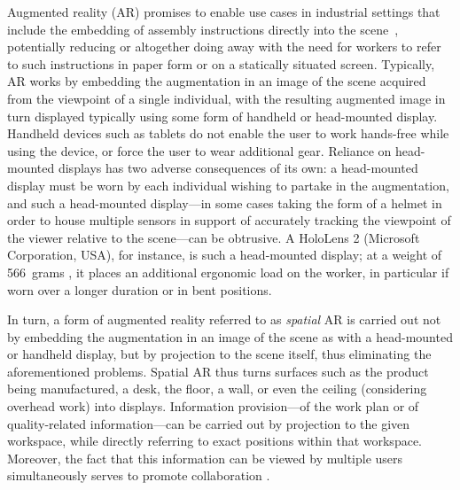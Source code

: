 \documentclass[review]{elsarticle}
\begin{document}
Augmented reality (AR) \cite{van2010survey,zhou2008trends} promises to enable use cases in industrial settings that include the embedding of assembly instructions directly into the scene~\cite{schlund2018moglichkeiten,uva2018evaluating,masood2019augmented,gattullo2019towards,aschenbrenner2019comparing,mayrhofer2019one,rupprecht2020information,Rupprecht2021}, potentially reducing or altogether doing away with the need for workers to refer to such instructions in paper form or on a statically situated screen. Typically, AR works by embedding the augmentation in an image of the scene acquired from the viewpoint of a single individual, with the resulting augmented image in turn displayed typically using some form of handheld or head-mounted display. Handheld devices such as tablets do not enable the user to work hands-free while using the device, or force the user to wear additional gear. Reliance on head-mounted displays has two adverse consequences of its own: a head-mounted display must be worn by each individual wishing to partake in the augmentation, and such a head-mounted display---in some cases taking the form of a helmet in order to house multiple sensors in support of accurately tracking the viewpoint of the viewer relative to the scene---can be obtrusive. A HoloLens 2 (Microsoft Corporation, USA), for instance, is such a head-mounted display; at a weight of 566~grams \cite{hololens}, it places an additional ergonomic load on the worker, in particular if worn over a longer duration or in bent positions.

In turn, a form of augmented reality referred to as \textit{spatial} AR\cite{bimber2019spatial} is carried out not by embedding the augmentation in an image of the scene as with a head-mounted or handheld display, but by projection to the scene itself, thus eliminating the aforementioned problems. Spatial AR thus turns surfaces such as the product being manufactured, a desk, the floor, a wall, or even the ceiling (considering overhead work) into displays. Information provision---of the work plan or of quality-related information---can be carried out by projection to the given workspace, while directly referring to exact positions within that workspace. Moreover, the fact that this information can be viewed by multiple users simultaneously serves to promote collaboration \cite{aschenbrenner2019comparing}.
\end{document}
